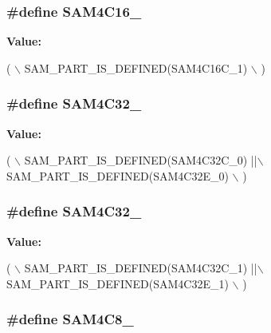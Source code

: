\hypertarget{group__sam__part__macros__group_ga9240bd8927b6ae5e76e4f60cbe18be4b}{
\subsubsection[{S\-A\-M4\-C16\-\_\-1}]{\setlength{\rightskip}{0pt plus 5cm}\#define S\-A\-M4\-C16\-\_}}\label{group__sam__part__macros__group_ga9240bd8927b6ae5e76e4f60cbe18be4b}
{\bfseries Value\-:}
\begin{DoxyCode}
( \(\backslash\)
                SAM\_PART\_IS\_DEFINED(SAM4C16C\_1) \(\backslash\)
                )
\end{DoxyCode}
\hypertarget{group__sam__part__macros__group_ga80a3a5850f6f7ac1b16a781c63e46c67}{
\subsubsection[{S\-A\-M4\-C32\-\_\-0}]{\setlength{\rightskip}{0pt plus 5cm}\#define S\-A\-M4\-C32\-\_}}\label{group__sam__part__macros__group_ga80a3a5850f6f7ac1b16a781c63e46c67}
{\bfseries Value\-:}
\begin{DoxyCode}
( \(\backslash\)
                SAM\_PART\_IS\_DEFINED(SAM4C32C\_0) ||\(\backslash\)
                SAM\_PART\_IS\_DEFINED(SAM4C32E\_0) \(\backslash\)
                )
\end{DoxyCode}
\hypertarget{group__sam__part__macros__group_ga84c94a3f93f7d2a0c440607a263477b7}{
\subsubsection[{S\-A\-M4\-C32\-\_\-1}]{\setlength{\rightskip}{0pt plus 5cm}\#define S\-A\-M4\-C32\-\_}}\label{group__sam__part__macros__group_ga84c94a3f93f7d2a0c440607a263477b7}
{\bfseries Value\-:}
\begin{DoxyCode}
( \(\backslash\)
                SAM\_PART\_IS\_DEFINED(SAM4C32C\_1) ||\(\backslash\)
                SAM\_PART\_IS\_DEFINED(SAM4C32E\_1) \(\backslash\)
                )
\end{DoxyCode}
\hypertarget{group__sam__part__macros__group_ga6210432e77e4bc0e170dc71370a3e845}{
\subsubsection[{S\-A\-M4\-C8\-\_\-0}]{\setlength{\rightskip}{0pt plus 5cm}\#define S\-A\-M4\-C8\-\_}}\label{group__sam__part__macros__group_ga6210432e77e4bc0e170dc71370a3e845}
